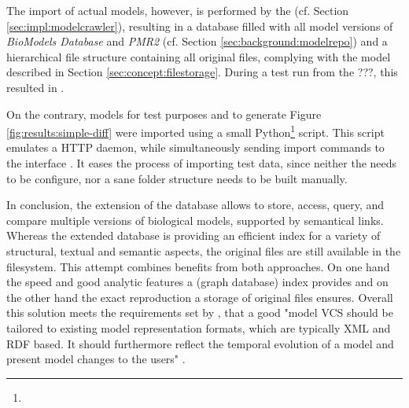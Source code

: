 The import of actual models, however, is performed by the \modelcrawler (cf. Section \ref{sec:impl:modelcrawler}), resulting in a \masymos database filled with all model versions of \emph{BioModels Database} and \emph{PMR2} (cf. Section \ref{sec:background:modelrepo}) and a hierarchical file structure containing all original files, complying with the model described in Section \ref{sec:concept:filestorage}.
During a test run from the ???, this resulted in .

On the contrary, models for test purposes and to generate Figure \ref{fig:results:simple-diff} were imported using a small Python\footnote{} script. This script emulates a HTTP daemon, while simultaneously sending import commands to the \masymos \rest interface \morre. It eases the process of importing test data, since neither the \modelcrawler needs to be configure, nor a sane folder structure needs to be built manually.

In conclusion, the extension of the \masymos database allows to store, access, query, and compare multiple versions of biological models, supported by semantical links. Whereas the extended \masymos database is providing an efficient index for a variety of structural, textual and semantic aspects, the original files are still available in the filesystem. This attempt combines benefits from both approaches. On one hand the speed and good analytic features a (graph database) index provides and on the other hand the exact reproduction a storage of original files ensures.
Overall this solution meets the requirements set by \citet{Waltemath2013}, that a good "model VCS should be tailored to existing model  representation formats, which are typically XML and RDF based. It should furthermore reflect the temporal evolution of a model and present model changes to the users" \citep{Waltemath2013}.

